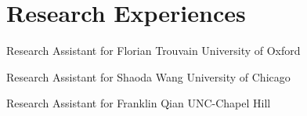 \documentclass[11pt,letterpaper]{report}
\begin{document}
    \section*{Research Experiences}

    \begin{description}[labelwidth=2.4cm, leftmargin=3cm, font=\normalfont]
        \item[2023 - 2024] Research Assistant for Florian Trouvain \hfill University of Oxford

        \item[2021 - 2022] Research Assistant for Shaoda Wang \hfill University of Chicago

        \item[2021 - 2022] Research Assistant for Franklin Qian \hfill UNC-Chapel Hill
    \end{description}
\end{document}
